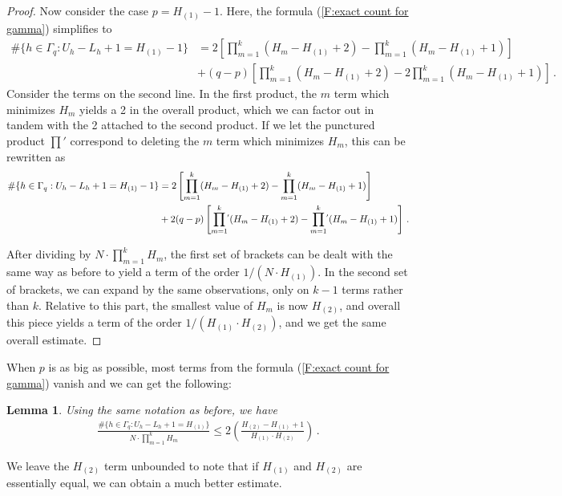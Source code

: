 \documentclass[11pt, oneside]{amsart}   	%
\newcommand{\1}{\mathbbm{1}}
\newtheorem{lemma}[theorem]{Lemma}
\theoremstyle{definition}
\begin{document}
\begin{proof}
Now consider the case $p = H_{(1)} - 1$. Here, the formula (\ref{F:exact count for gamma}) simplifies to
\begin{align*}
\#\{h\in \Gamma_q : U_h - L_h +1 = H_{(1)}-1\} &= 2 \left[ \prod_{m=1}^k (H_m - H_{(1)} + 2) - \prod_{m=1}^k (H_m - H_{(1)} + 1)\right] \\
&+ (q - p) \left[ \prod_{m=1}^k (H_m - H_{(1)} + 2) - 2\prod_{m=1}^k (H_m - H_{(1)}+1)\right]\, .
\end{align*}
Consider the terms on the second line. In the first product, the $m$ term which minimizes $H_m$ yields a 2 in the overall product, which we can factor out in tandem with the 2 attached to the second product. If we let the punctured product $\prod '$ correspond to deleting the $m$ term which minimizes $H_m$, this can be rewritten as
\begin{align*}
\#\{h\in \Gamma_q : U_h - L_h +1 = H_{(1)}-1\} &= 2 \left[ \prod_{m=1}^k (H_m - H_{(1)} + 2) - \prod_{m=1}^k (H_m - H_{(1)} + 1)\right] \\
&+ 2(q - p) \left[ \prod_{m=1}^k\mathop{}^{\mkern-5mu '} (H_m - H_{(1)} + 2) - \prod_{m=1}^k\mathop{}^{\mkern-5mu '} (H_m - H_{(1)}+1)\right] \, .
\end{align*}

After dividing by $N \cdot \prod_{m=1}^k H_m$, the first set of brackets can be dealt with the same way as before to yield a term of the order $1/(N \cdot H_{(1)})$. In the second set of brackets, we can expand by the same observations, only on $k-1$ terms rather than $k$. Relative to this part, the smallest value of $H_m$ is now $H_{(2)}$, and overall this piece yields a term of the order $1/({H_{(1)}} \cdot H_{(2)})$, and we get the same overall estimate.
\end{proof}

When $p$ is as big as possible, most terms from the formula (\ref{F:exact count for gamma}) vanish and we can get the following:
\begin{lemma}\label{L:est for big p}
Using the same notation as before, we have
\begin{align}\label{E:est for big p}
\frac{\#\{h\in \Gamma_q : U_h - L_h +1 = H_{(1)}\}}{N \cdot \prod_{m=1}^k H_m} \leq 2\left(\frac{H_{(2)} - H_{(1)} + 1}{H_{(1)}\cdot H_{(2)}}\right) \, .
\end{align}
\end{lemma}
We leave the $H_{(2)}$ term unbounded to note that if $H_{(1)}$ and $H_{(2)}$ are essentially equal, we can obtain a much better estimate.
\end{document}
